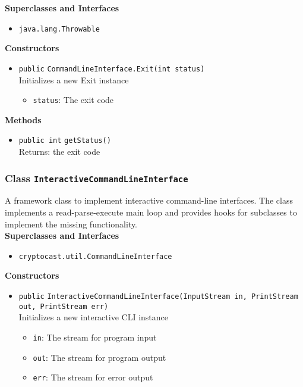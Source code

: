 \textbf{Superclasses and Interfaces}
\begin{itemize}
\item \lstinline|java.lang.Throwable|
\end{itemize}



\textbf{Constructors}
\begin{itemize}
\item \lstinline|public| \lstinline|CommandLineInterface.Exit|\lstinline|(int status)|\\
Initializes a new Exit instance
\begin{itemize}
\item \lstinline|status|: The exit code
\end{itemize}



\end{itemize}


\textbf{Methods}
\begin{itemize}
\item \lstinline|public int| \lstinline|getStatus|\lstinline|()|\\
Returns: the exit code



\end{itemize}

\subsubsection{Class \lstinline|InteractiveCommandLineInterface|}
A framework class to implement interactive command-line interfaces. The class implements
 a read-parse-execute main loop and provides hooks for subclasses to implement the missing
 functionality. \\


\textbf{Superclasses and Interfaces}
\begin{itemize}
\item \lstinline|cryptocast.util.CommandLineInterface|
\end{itemize}



\textbf{Constructors}
\begin{itemize}
\item \lstinline|public| \lstinline|InteractiveCommandLineInterface|\lstinline|(InputStream in, PrintStream out, PrintStream err)|\\
Initializes a new interactive CLI instance
\begin{itemize}
\item \lstinline|in|: The stream for program input
\item \lstinline|out|: The stream for program output
\item \lstinline|err|: The stream for error output
\end{itemize}



\end{itemize}


